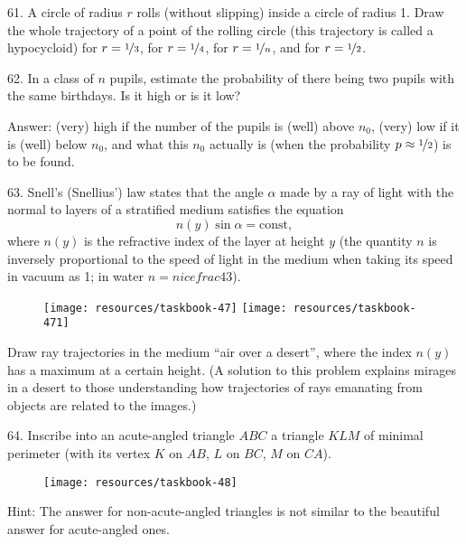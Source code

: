 \begin{problem}{61.}
A circle of radius $r$ rolls (without slipping) inside a circle of radius 1.
Draw the whole trajectory of a point of the rolling circle (this trajectory is called a hypocycloid)
for $r=\nicefrac{1}{3}$, for $r=\nicefrac{1}{4}$, for $r=\nicefrac{1}{n}$, and for $r=\nicefrac{1}{2}$.
\end{problem}

\begin{problem}{62.}
In a class of $n$ pupils, estimate the probability of there being two pupils with the same birthdays. Is it high or is it low?

\begin{note}{Answer:}
	(very) high if the number of the pupils is (well) above $n_0$,
	(very) low if it is (well) below $n_0$, and what this $n_0$ actually is
	(when the probability $p \approx \nicefrac{1}{2}$) is to be found.
\end{note}
\end{problem}

\begin{problem}{63.}
Snell's (Snellius') law states that the angle $\alpha$ made by a ray of light with the normal to layers of a stratified medium satisfies the equation
\begin{equation*}
	n(y) \sin \alpha=\text{const},
\end{equation*}
where $n(y)$ is the refractive index of the layer at height $y$ (the quantity $n$ is	inversely proportional to the speed
of light in the medium when taking its speed in vacuum as 1; in water $n=nicefrac{4}{3}$).
\begin{figure}
	\null\hfill
	\texttt{[image: resources/taskbook-47]}
	\hfill
	\texttt{[image: resources/taskbook-471]}
	\hfill\null
\end{figure}

Draw ray trajectories in the medium  \enquote{air over a desert}, where the index $n(y)$ has a maximum
at a certain height.
(A solution to this problem explains mirages in a desert to those understanding how trajectories of rays emanating from objects are related to the images.)
\end{problem}

\begin{problem}{64.}
Inscribe into an acute-angled triangle $ABC$ a triangle $KLM$ of minimal perimeter
(with its vertex $K$ on $AB$, $L$ on $BC$, $M$ on $CA$).
\begin{figure}
	\texttt{[image: resources/taskbook-48]}
\end{figure}

\begin{note}{Hint:}
	The answer for non-acute-angled triangles is not similar to the beautiful answer for acute-angled ones.
\end{note}
\end{problem}

